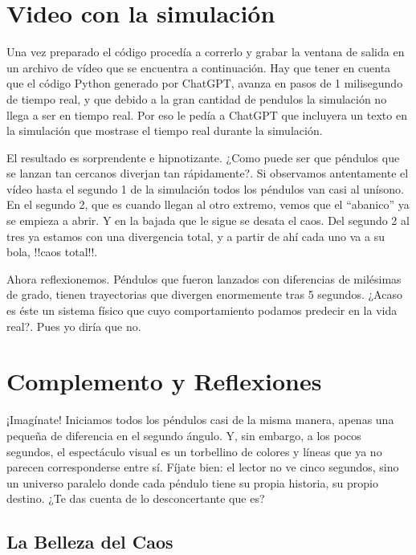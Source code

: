 \documentclass[
  11pt,
  a4paper,
  DIV=11,
  numbers=noendperiod]{scrreprt}
\begin{document}
\section{Video con la simulación}\label{sec-abanico}

Una vez preparado el código procedía a correrlo y grabar la ventana de
salida en un archivo de vídeo que se encuentra a continuación. Hay que
tener en cuenta que el código Python generado por ChatGPT, avanza en
pasos de 1 milisegundo de tiempo real, y que debido a la gran cantidad
de pendulos la simulación no llega a ser en tiempo real. Por eso le
pedía a ChatGPT que incluyera un texto en la simulación que mostrase el
tiempo real durante la simulación.

El resultado es sorprendente e hipnotizante. ¿Como puede ser que
péndulos que se lanzan tan cercanos diverjan tan rápidamente?. Si
observamos antentamente el vídeo hasta el segundo 1 de la simulación
todos los péndulos van casi al unísono. En el segundo 2, que es cuando
llegan al otro extremo, vemos que el ``abanico'' ya se empieza a abrir.
Y en la bajada que le sigue se desata el caos. Del segundo 2 al tres ya
estamos con una divergencia total, y a partir de ahí cada uno va a su
bola, !!caos total!!.

Ahora reflexionemos. Péndulos que fueron lanzados con diferencias de
milésimas de grado, tienen trayectorias que divergen enormemente tras 5
segundos. ¿Acaso es éste un sistema físico que cuyo comportamiento
podamos predecir en la vida real?. Pues yo diría que no.

\section{Complemento y Reflexiones}\label{complemento-y-reflexiones}

¡Imagínate! Iniciamos todos los péndulos casi de la misma manera, apenas
una pequeña de diferencia en el segundo ángulo. Y, sin embargo, a los
pocos segundos, el espectáculo visual es un torbellino de colores y
líneas que ya no parecen corresponderse entre sí. Fíjate bien: el lector
no ve cinco segundos, sino un universo paralelo donde cada péndulo tiene
su propia historia, su propio destino. ¿Te das cuenta de lo
desconcertante que es?

\subsection{La Belleza del Caos}\label{la-belleza-del-caos}
\end{document}
